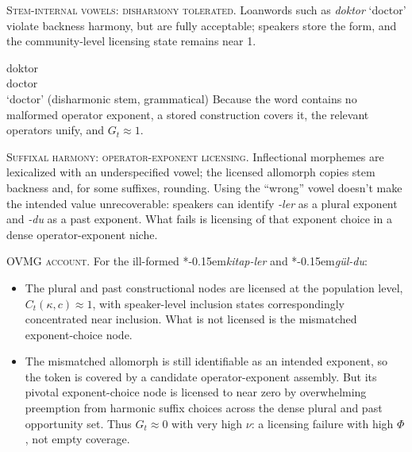 \documentclass[12pt,letterpaper]{article}
\newcommand{\mention}[1]{\textit{#1}}
\newcommand{\judgesep}{\kern-0.15em}
\newcommand{\ungram}[1]{*\judgesep#1}
\begin{document}
\noindent\textsc{Stem-internal vowels: disharmony tolerated.} Loanwords such as \mention{doktor} `doctor' violate backness harmony, but are fully acceptable; speakers store the form, and the community-level licensing state remains near 1.

\ea \label{ex:doktor}
\gll doktor \\
     doctor\\
\glt `doctor' (disharmonic stem, grammatical)
\z
Because the word contains no malformed operator exponent, a stored construction covers it, the relevant operators unify, and $G_t\approx1$.

\noindent\textsc{Suffixal harmony: operator-exponent licensing.} Inflectional morphemes are lexicalized with an underspecified vowel; the licensed allomorph copies stem backness and, for some suffixes, rounding. Using the \enquote{wrong} vowel doesn't make the intended value unrecoverable: speakers can identify \mention{-ler} as a plural exponent and \mention{-du} as a past exponent. What fails is licensing of that exponent choice in a dense operator-exponent niche.

\ea  \label{ex:kitap-pl}
\z
\z

\ea \label{ex:gul-past}
\z
\z

\noindent\textsc{OVMG account.} For the ill-formed \ungram{\mention{kitap-ler}} and \ungram{\mention{gül-du}}:

\begin{itemize}
\item The plural and past constructional nodes are licensed at the population
  level, $C_t(\kappa,c)\approx1$, with speaker-level inclusion states
  correspondingly concentrated near inclusion. What is not licensed is the
  mismatched exponent-choice node.
\item The mismatched allomorph is still identifiable as an intended exponent,
  so the token is covered by a candidate operator-exponent assembly. But its
  pivotal exponent-choice node is licensed to near zero by overwhelming
  preemption from harmonic suffix choices across the dense plural and past
  opportunity set. Thus $G_t\approx0$ with very high $\nu$: a
  licensing failure with high $\Phi$, not empty coverage.
\end{itemize}
\end{document}

